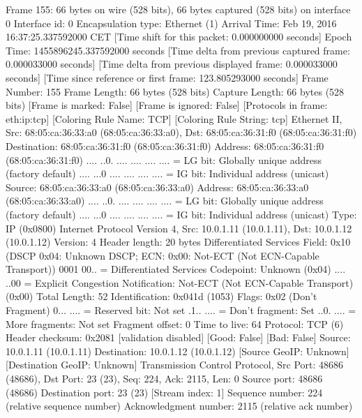 Frame 155: 66 bytes on wire (528 bits), 66 bytes captured (528 bits) on interface 0
    Interface id: 0
    Encapsulation type: Ethernet (1)
    Arrival Time: Feb 19, 2016 16:37:25.337592000 CET
    [Time shift for this packet: 0.000000000 seconds]
    Epoch Time: 1455896245.337592000 seconds
    [Time delta from previous captured frame: 0.000033000 seconds]
    [Time delta from previous displayed frame: 0.000033000 seconds]
    [Time since reference or first frame: 123.805293000 seconds]
    Frame Number: 155
    Frame Length: 66 bytes (528 bits)
    Capture Length: 66 bytes (528 bits)
    [Frame is marked: False]
    [Frame is ignored: False]
    [Protocols in frame: eth:ip:tcp]
    [Coloring Rule Name: TCP]
    [Coloring Rule String: tcp]
Ethernet II, Src: 68:05:ca:36:33:a0 (68:05:ca:36:33:a0), Dst: 68:05:ca:36:31:f0 (68:05:ca:36:31:f0)
    Destination: 68:05:ca:36:31:f0 (68:05:ca:36:31:f0)
        Address: 68:05:ca:36:31:f0 (68:05:ca:36:31:f0)
        .... ..0. .... .... .... .... = LG bit: Globally unique address (factory default)
        .... ...0 .... .... .... .... = IG bit: Individual address (unicast)
    Source: 68:05:ca:36:33:a0 (68:05:ca:36:33:a0)
        Address: 68:05:ca:36:33:a0 (68:05:ca:36:33:a0)
        .... ..0. .... .... .... .... = LG bit: Globally unique address (factory default)
        .... ...0 .... .... .... .... = IG bit: Individual address (unicast)
    Type: IP (0x0800)
Internet Protocol Version 4, Src: 10.0.1.11 (10.0.1.11), Dst: 10.0.1.12 (10.0.1.12)
    Version: 4
    Header length: 20 bytes
    Differentiated Services Field: 0x10 (DSCP 0x04: Unknown DSCP; ECN: 0x00: Not-ECT (Not ECN-Capable Transport))
        0001 00.. = Differentiated Services Codepoint: Unknown (0x04)
        .... ..00 = Explicit Congestion Notification: Not-ECT (Not ECN-Capable Transport) (0x00)
    Total Length: 52
    Identification: 0x041d (1053)
    Flags: 0x02 (Don't Fragment)
        0... .... = Reserved bit: Not set
        .1.. .... = Don't fragment: Set
        ..0. .... = More fragments: Not set
    Fragment offset: 0
    Time to live: 64
    Protocol: TCP (6)
    Header checksum: 0x2081 [validation disabled]
        [Good: False]
        [Bad: False]
    Source: 10.0.1.11 (10.0.1.11)
    Destination: 10.0.1.12 (10.0.1.12)
    [Source GeoIP: Unknown]
    [Destination GeoIP: Unknown]
Transmission Control Protocol, Src Port: 48686 (48686), Dst Port: 23 (23), Seq: 224, Ack: 2115, Len: 0
    Source port: 48686 (48686)
    Destination port: 23 (23)
    [Stream index: 1]
    Sequence number: 224    (relative sequence number)
    Acknowledgment number: 2115    (relative ack number)
